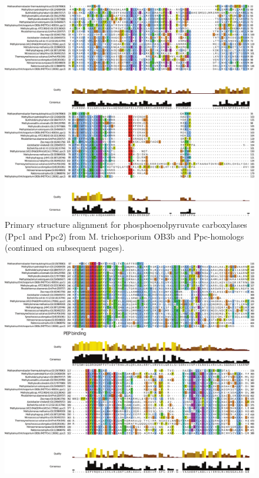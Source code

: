 \begin{figure}[H]
\centering
     \includegraphics[width=1.0\textwidth]{./tex/chapter1/figures/supplemental/FigureS6a.pdf}
     \begin{singlespace}
     \caption[Structure alignment for phosphoenolpyruvate carboxylases (Ppc1 and Ppc2) from M. trichosporium OB3b and Ppc-homologs]{
        Primary structure alignment for phosphoenolpyruvate carboxylases (Ppc1 and Ppc2) from M. trichosporium OB3b and Ppc-homologs (continued on subsequent pages).
        }
     \label{fig:S6} %
     \end{singlespace}
\end{figure}

\begin{figure}[H]
\centering
     \includegraphics[width=1.0\textwidth]{./tex/chapter1/figures/supplemental/FigureS6c.pdf}
\end{figure}

